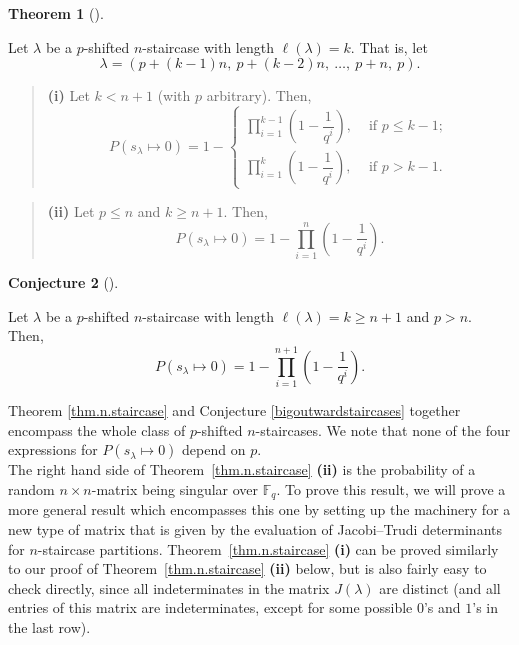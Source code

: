 \documentclass[numbers=enddot,12pt,final,onecolumn,notitlepage]{scrartcl}%
\theoremstyle{definition}
\newtheorem{theo}{Theorem}[section]
\newenvironment{theorem}[1][]
{\begin{theo}[#1]\begin{leftbar}}
{\end{leftbar}\end{theo}}
\newtheorem{conj}[theo]{Conjecture}
\newenvironment{conjecture}[1][]
{\begin{conj}[#1]\begin{leftbar}}
{\end{leftbar}\end{conj}}
\newenvironment{statement}{\begin{quote}}{\end{quote}}
\let\prodnonlimits\prod
\renewcommand{\prod}{\prodnonlimits\limits}
\newcommand{\tup}[1]{\left( #1 \right)}
\renewcommand{\leq}{\leqslant}
\renewcommand{\geq}{\geqslant}
\theoremstyle{plainsl}
\begin{document}
\begin{theorem}
\label{thm.n.staircase}

Let $\lambda$ be a $p$-shifted $n$-staircase with
length $\ell(\lambda) = k$. That is, let
\[\lambda = (p+(k-1)n, \ p+(k-2)n, \ \ldots, \ p+n, \  p) . \]

\begin{statement}
\textbf{(i)} Let $k < n+1$ (with $p$ arbitrary). Then,
\[
P(s_{\lambda} \longmapsto 0) =
1 -
\begin{cases}
\prod_{i=1}^{k-1} \left(  1-\dfrac{1}{q^{i}}\right) ,
& \text{ if } p \leq k-1; \\
\prod_{i=1}^{k} \left(  1-\dfrac{1}{q^{i}}\right) ,
& \text{ if } p > k-1.
\end{cases}
\]
\end{statement}
 
\begin{statement}
\textbf{(ii)} Let $p \leq n$ and $k \geq n+1$. Then, 
\[
P(s_{\lambda} \longmapsto 0) = 1- \prod_{i=1}^{n} \left(  1-\dfrac{1}{q^{i}}\right) .
\]
\end{statement}
\end{theorem}

\begin{conjecture}
\label{bigoutwardstaircases}
Let $\lambda$ be a $p$-shifted $n$-staircase with length $\ell(\lambda) = k \geq n+1$ and $p > n$.  Then,
\[
P(s_{\lambda} \longmapsto 0) = 1-\prod_{i=1}^{n+1} \left(  1-\dfrac{1}{q^{i}}\right).
\]
\end{conjecture}


Theorem \ref{thm.n.staircase} and Conjecture \ref{bigoutwardstaircases} together encompass the whole class of $p$-shifted $n$-staircases. We note that none of the four expressions for $P(s_{\lambda} \longmapsto 0)$ depend on $p$. \\

The right hand side of Theorem~\ref{thm.n.staircase} \textbf{(ii)}
is the probability of a random $n\times n$-matrix being singular over $\mathbb{F}_q$. To prove this result, we will prove a more general result which encompasses this one by setting up the machinery for a new type of matrix that is given by the evaluation of Jacobi--Trudi determinants for $n$-staircase partitions.  
Theorem~\ref{thm.n.staircase} \textbf{(i)} can be proved similarly to our proof of Theorem~\ref{thm.n.staircase} \textbf{(ii)} below,
but is also fairly easy to check directly, since all indeterminates
in the matrix $J\tup{\lambda}$ are distinct (and all entries of this
matrix are indeterminates, except for some possible $0$'s and $1$'s
in the last row).
\end{document}
